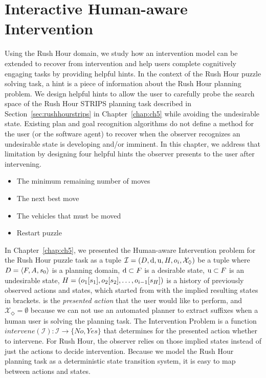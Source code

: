 \chapter{Interactive Human-aware Intervention}
\label{chap:ch6}
Using the Rush Hour domain, we study how an intervention model can be extended to recover from intervention and help users complete cognitively engaging tasks by providing helpful hints. 
In the context of the Rush Hour puzzle solving task, a hint is a piece of information about the Rush Hour planning problem. 
We design helpful hints to allow the user to carefully probe the search space of the Rush Hour STRIPS planning task described in Section~\ref{sec:rushhourstrips} in
Chapter~\ref{chap:ch5} while avoiding the undesirable state.
Existing plan and goal recognition algorithms do not define a method for the user (or the software agent) to recover when the observer recognizes an undesirable state is developing and/or imminent.
In this chapter, we address that limitation by designing four helpful hints the observer presents to the user after intervening.
\begin{itemize}
\item The minimum remaining number of moves
\item The next best move
\item The vehicles that must be moved
\item Restart puzzle
\end{itemize}


In Chapter~\ref{chap:ch5}, we presented the Human-aware Intervention problem for the Rush Hour puzzle task as a tuple
$\mathcal{I} = (D, \mathrm{d}, \mathrm{u}, H, o_i, \mathcal{X}_\Diamond)$ be a tuple where
  $D=\langle F, A, s_0 \rangle$ is a planning domain,
  $\mathrm{d} \subset F$ is a desirable state,
  $\mathrm{u} \subset F$ is an undesirable state,
  $H = ( o_1 [s_1], o_2 [s_2], \ldots, o_{i-1} [s_{H}])$ is a history of previously observed actions and states, which started from \initialState with the implied resulting states in brackets.
  \presentedAction is the \emph{presented action} that the user would like to perform, and
  $\mathcal{X}_\Diamond = \emptyset$ because we can not use an automated planner to extract suffixes when a human user is solving the planning task.
The \textnormal{Intervention Problem} is a function $intervene (\mathcal{I}) :  \mathcal{I} \rightarrow \{No, Yes\} $
that determines for the presented action \presentedAction whether to intervene.
For Rush Hour, the observer relies on those implied states instead of just the actions to decide intervention.
Because we model the Rush Hour planning task as a deterministic state transition system,  it is easy to map between actions and states.

